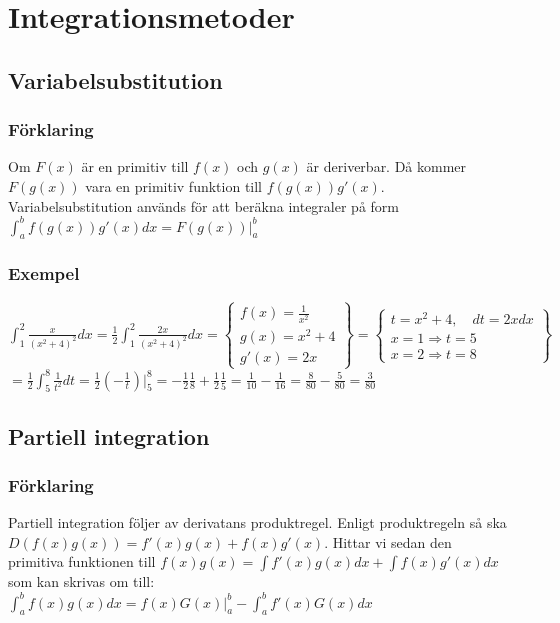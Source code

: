 \documentclass{article}
\begin{document}
\newpage
\section{Integrationsmetoder}
\subsection{Variabelsubstitution}
\subsubsection{Förklaring}
Om $F(x)$ är en primitiv till $f(x)$ och $g(x)$ är deriverbar. Då kommer $F(g(x))$ vara en primitiv funktion till $f(g(x))g'(x)$. Variabelsubstitution används för att beräkna integraler på form ${\displaystyle\int_{a}^{b}f(g(x))g'(x)dx=F(g(x))\bigg\vert_{a}^{b}}$

\subsubsection{Exempel}
${\displaystyle \int_{1}^{2}\frac{x}{(x^2+4)^2}dx = \frac{1}{2}\int_{1}^{2}\frac{2x}{(x^2+4)^2}dx = \left\{
\begin{array}{l}
    f(x) = \frac{1}{x^2}   \\
    g(x) = x^2+4           \\
    g'(x)= 2x
\end{array}
\right\} = \left\{
\begin{array}{l}
    t=x^2+4,\quad dt=2xdx \\
    x=1 \Rightarrow t=5 \\
    x=2 \Rightarrow t=8
\end{array}
\right\}}$ \\
${\displaystyle= \frac{1}{2}\int_{5}^{8}\frac{1}{t^2}dt = \frac{1}{2}(-\frac{1}{t})\bigg\vert_{5}^{8}=-\frac{1}{2}\frac{1}{8}+\frac{1}{2}\frac{1}{5}=\frac{1}{10}-\frac{1}{16}=\frac{8}{80}-\frac{5}{80}=\frac{3}{80}}$

\subsection{Partiell integration}
\subsubsection{Förklaring}
Partiell integration följer av derivatans produktregel. Enligt produktregeln så ska $D(f(x)g(x))=f'(x)g(x)+f(x)g'(x)$. Hittar vi sedan den primitiva funktionen till ${\displaystyle f(x)g(x)=\int f'(x)g(x)dx + \int f(x)g'(x)dx}$ som kan skrivas om till:\\
${\displaystyle\int_{a}^{b}f(x)g(x)dx=f(x)G(x)\bigg\vert_{a}^{b} - \int_{a}^{b}f'(x)G(x)dx}$
\end{document}
